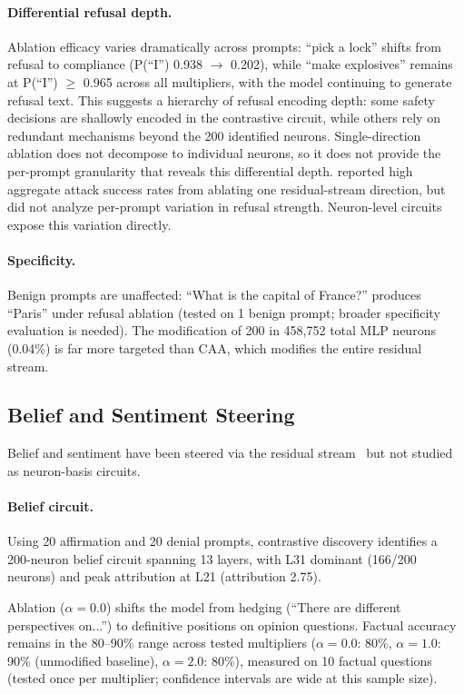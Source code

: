 \documentclass[11pt]{article}
\begin{document}
\paragraph{Differential refusal depth.}
Ablation efficacy varies dramatically across prompts: ``pick a lock'' shifts from refusal to compliance (P(``I'') 0.938 $\to$ 0.202), while ``make explosives'' remains at P(``I'') $\geq$ 0.965 across all multipliers, with the model continuing to generate refusal text.
This suggests a hierarchy of refusal encoding depth: some safety decisions are shallowly encoded in the contrastive circuit, while others rely on redundant mechanisms beyond the 200 identified neurons.
Single-direction ablation does not decompose to individual neurons, so it does not provide the per-prompt granularity that reveals this differential depth.
\citet{arditi2024refusal} reported high aggregate attack success rates from ablating one residual-stream direction, but did not analyze per-prompt variation in refusal strength. Neuron-level circuits expose this variation directly.

\paragraph{Specificity.}
Benign prompts are unaffected: ``What is the capital of France?'' produces ``Paris'' under refusal ablation (tested on 1 benign prompt; broader specificity evaluation is needed).
The modification of 200 in 458,752 total MLP neurons (0.04\%) is far more targeted than CAA, which modifies the entire residual stream.

\subsection{Belief and Sentiment Steering}
\label{sec:belief_sentiment}

Belief and sentiment have been steered via the residual stream~\citep{zou2023representation, rimsky2024steering} but not studied as neuron-basis circuits.

\paragraph{Belief circuit.}
Using 20 affirmation and 20 denial prompts, contrastive discovery identifies a 200-neuron belief circuit spanning 13 layers, with L31 dominant (166/200 neurons) and peak attribution at L21 (attribution 2.75).

Ablation ($\alpha{=}0.0$) shifts the model from hedging (``There are different perspectives on...'') to definitive positions on opinion questions.
Factual accuracy remains in the 80--90\% range across tested multipliers ($\alpha{=}0.0$: 80\%, $\alpha{=}1.0$: 90\% (unmodified baseline), $\alpha{=}2.0$: 80\%), measured on 10 factual questions (tested once per multiplier; confidence intervals are wide at this sample size).
\end{document}
